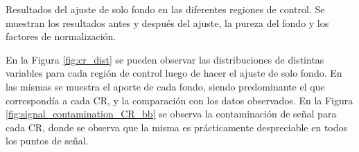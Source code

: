 \begin{table}[ht!]
  \centering
  \caption{Resultados del ajuste de solo fondo en las diferentes regiones de control. Se muestran los resultados antes y después del ajuste, la pureza del fondo y los factores de normalización.}
  
  \label{tab:bkgonly_cr}
\end{table}

En la Figura \ref{fig:cr_dist} se pueden observar las distribuciones de distintas variables para cada región de control luego de hacer el ajuste de solo fondo. En las mismas se muestra el aporte de cada fondo, siendo predominante el que correspondía a cada CR, y la comparación con los datos observados. En la Figura \ref{fig:signal_contamination_CR_bb} se observa la contaminación de señal para cada CR, donde se observa que la misma es prácticamente despreciable en todos los puntos de señal.



